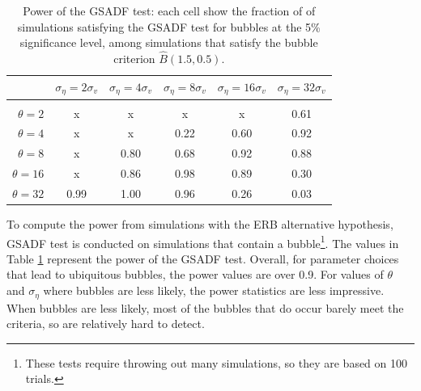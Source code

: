 \documentclass[12pt]{article}
\begin{document}
\begin{table}[h]
    \centering
\begin{tabular}{rccccc}
\hline  
            & \multicolumn{1}{l}{$\sigma_{\eta} =2\sigma_{v}$} & \multicolumn{1}{l}{$\sigma_{\eta} =4\sigma_{v}$} & \multicolumn{1}{l}{$\sigma_{\eta} =8\sigma_{v}$} & \multicolumn{1}{l}{$\sigma_{\eta} =16\sigma_{v}$} & \multicolumn{1}{l}{$\sigma_{\eta} =32\sigma_{v}$} \\ \hline  \vspace{-3mm} \\        
$\theta=2$             & x                            & x                            & x                            & x                             & 0.61                         \\ \hline
$\theta=4$             & x                            & x                            & 0.22                        & 0.60                         & 0.92                         \\ \hline
$\theta=8$             & x                            & 0.80                        & 0.68                        & 0.92                         & 0.88                         \\ \hline
$\theta=16$            & x                            & 0.86                        & 0.98                        & 0.89                         & 0.30                         \\ \hline
$\theta=32$            & 0.99                        & 1.00                        & 0.96                        & 0.26                         & 0.03                         \\ \hline
\end{tabular}
\caption{Power of the GSADF test:  each cell show the fraction of of simulations satisfying the GSADF test for bubbles at the 5\% significance level, among simulations that satisfy the bubble criterion $\widehat{B}(1.5,0.5)$.}
\label{GSADFpower}
\end{table}

To compute the power from simulations with the ERB alternative hypothesis, GSADF test is conducted on simulations that contain a bubble\footnote{These tests require throwing out many simulations, so they are based on 100 trials.}. The values in Table \ref{GSADFpower} represent the power of the GSADF test. Overall, for parameter choices that lead to ubiquitous bubbles, the power values are over 0.9. For values of $\theta$ and $\sigma_{\eta}$ where bubbles are less likely, the power statistics are less impressive. When bubbles are less likely, most of the bubbles that do occur barely meet the criteria, so are relatively hard to detect.
\end{document}
